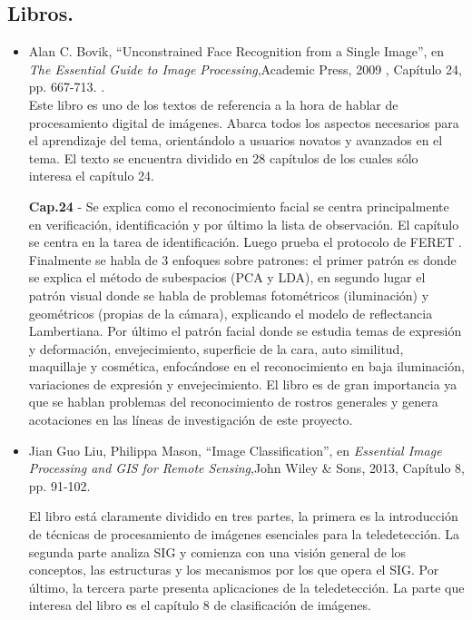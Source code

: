 \documentclass[letterpaper,12pt]{article}
\begin{document}
\subsection{Libros.}
%
%

\begin{itemize}
\item Alan C. Bovik,
{``Unconstrained Face Recognition from a Single Image'', en \textit{The Essential Guide to Image Processing}},Academic Press, 2009 , Capítulo 24, pp. 667-713. \cite{Bovik}.\\

Este libro es uno de los textos de referencia a la hora de hablar de procesamiento digital de imágenes. Abarca todos los aspectos necesarios para el aprendizaje del tema, orientándolo a usuarios novatos y avanzados en el tema. El texto se encuentra dividido en 28 capítulos de los cuales sólo interesa  el capítulo 24.

\textbf{Cap.24} -  Se explica como el reconocimiento facial se centra principalmente en verificación, identificación y por último la lista de observación. El capítulo se centra en la tarea de identificación. Luego prueba el protocolo de FERET \cite{JPhillips}. Finalmente se habla de 3 enfoques sobre patrones: el primer patrón es donde se explica el método de subespacios (PCA y LDA), en segundo lugar el patrón visual donde se habla de problemas fotométricos (iluminación) y geométricos (propias de la cámara), explicando el modelo de reflectancia Lambertiana. Por último el patrón facial donde se estudia temas de expresión y deformación, envejecimiento, superficie de la cara, auto similitud, maquillaje y cosmética, enfocándose en el reconocimiento en baja iluminación, variaciones de expresión y envejecimiento. El libro es de gran importancia ya que se hablan problemas del reconocimiento de rostros generales y genera acotaciones en las líneas de investigación de este proyecto.


\item Jian Guo Liu, Philippa Mason,
{``Image Classification'', en \textit{Essential Image Processing and GIS for Remote Sensing}},John Wiley \& Sons, 2013, Capítulo 8, pp. 91-102. \cite{Libro02}

El libro está claramente dividido en tres partes, la primera es la introducción de técnicas de procesamiento de imágenes esenciales para la teledetección. La segunda parte analiza SIG y comienza con una visión general de los conceptos, las estructuras y los mecanismos por los que opera el SIG. Por último, la tercera parte presenta aplicaciones de la teledetección. La parte que interesa del libro es el capítulo 8 de clasificación de imágenes.



\end{itemize}
\end{document}

